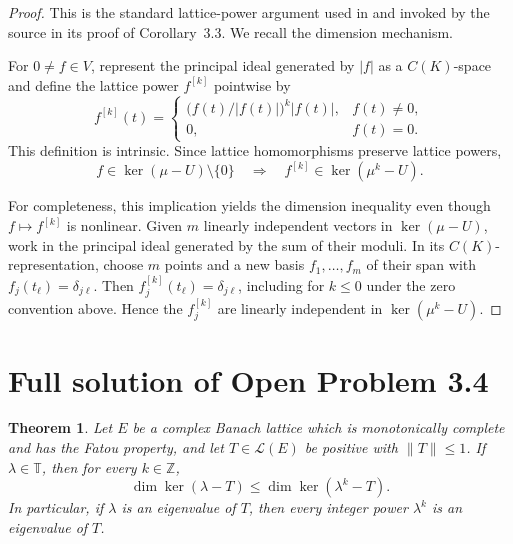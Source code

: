 \documentclass[11pt]{article}
\newtheorem{theorem}{Theorem}
\newcommand{\cL}{\mathcal L}
\newcommand{\Torus}{\mathbb T}
\begin{document}
\begin{proof}
This is the standard lattice-power argument used in
\cite[Proposition~3.1]{GlueckPeripheral} and invoked by the source in its
proof of Corollary~3.3.  We recall the dimension mechanism.

For \(0\neq f\in V\), represent the principal ideal generated by \(|f|\) as
a \(C(K)\)-space and define the lattice power \(f^{[k]}\) pointwise by
\[
 f^{[k]}(t)=
 \begin{cases}
   \bigl(f(t)/|f(t)|\bigr)^k |f(t)|,&f(t)\neq0,\\
   0,&f(t)=0.
 \end{cases}
\]
This definition is intrinsic.  Since lattice homomorphisms preserve lattice
powers,
\[
 f\in\ker(\mu-U)\setminus\{0\}
 \quad\Longrightarrow\quad
 f^{[k]}\in\ker(\mu^k-U).
\]

For completeness, this implication yields the dimension inequality even
though \(f\mapsto f^{[k]}\) is nonlinear.  Given \(m\) linearly independent
vectors in \(\ker(\mu-U)\), work in the principal ideal generated by the sum
of their moduli.  In its \(C(K)\)-representation, choose \(m\) points and a
new basis \(f_1,\ldots,f_m\) of their span with
\(f_j(t_\ell)=\delta_{j\ell}\).  Then
\(f_j^{[k]}(t_\ell)=\delta_{j\ell}\), including for \(k\leq0\) under the
zero convention above.  Hence the \(f_j^{[k]}\) are linearly independent in
\(\ker(\mu^k-U)\).
\end{proof}

\section*{Full solution of Open Problem 3.4}

\begin{theorem}\label{thm:main}
Let \(E\) be a complex Banach lattice which is monotonically complete and
has the Fatou property, and let \(T\in\cL(E)\) be positive with
\(\|T\|\leq1\).  If \(\lambda\in\Torus\), then for every \(k\in\mathbb Z\),
\[
 \dim\ker(\lambda-T)\leq\dim\ker(\lambda^k-T).
\]
In particular, if \(\lambda\) is an eigenvalue of \(T\), then every integer
power \(\lambda^k\) is an eigenvalue of \(T\).
\end{theorem}
\end{document}
